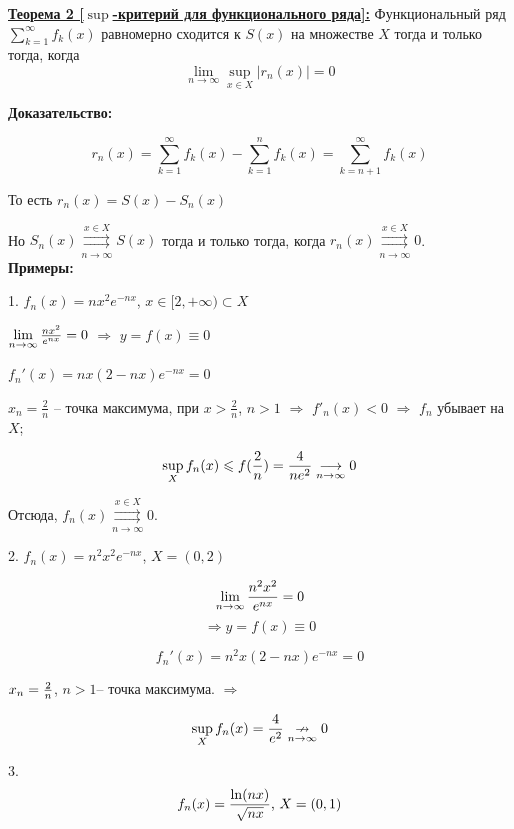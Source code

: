 \documentclass[a4paper,12pt]{article} %
\renewcommand {\leq}{\leqslant}
\begin{document}
\underline{\textbf{Теорема 2 [$\sup$-критерий для функционального ряда]:}}\newline 
Функциональный ряд $\sum\limits_{k = 1}^{\infty}  f_k(x)$ равномерно сходится к $S(x)$ на множестве $X$ тогда и только тогда, когда $$\lim\limits_{n \rightarrow \infty} \sup_{x \in X} |r_n(x)| = 0$$

\textbf{Доказательство:} 

$$r_n(x) = \sum\limits_{k = 1}^{\infty}  f_k(x) -  \sum\limits_{k = 1}^{n}  f_k(x)= \sum\limits_{k = n+1}^{\infty}  f_k(x)$$ \newline

То есть $r_n(x)=S(x)-S_n(x)$ \newline

Но $S_n(x) \overset{x \in X}{\underset{n \rightarrow \infty}{\rightrightarrows}} S(x)$ тогда и только тогда, когда $r_n(x) \overset{x \in X}{\underset{n \rightarrow \infty}{\rightrightarrows}} 0$.\\

\textbf{Примеры:}

1. $f_n(x) = nx^2e^{-nx}$, $x \in [2, +\infty) \subset X$

$\lim\limits_{n \rightarrow \infty}{nx^2 \over e^{nx}} = 0$ $\Rightarrow$ $y=f(x) \equiv 0$

$f_n'(x) = nx(2-nx)e^{-nx} = 0$

\hspace*{5mm}$x_n = {\frac{2}{n}}$ -- точка максимума, при $x > {\frac{2}{n}}$, $n>1$ $\Rightarrow$ $f'_n(x) < 0$ $\Rightarrow$ $f_n$ убывает на $X$;

$$\sup_{X}f_n(x) \leq f({2\over n}) = {4\over ne^2} \underset{n \rightarrow \infty}{\longrightarrow} 0 $$

Отсюда, $f_n(x) \overset{x \in X}{\underset{n \rightarrow \infty}{\rightrightarrows}} 0$.

2. $f_n(x) = n^2x^2e^{-nx}$, $X = (0,2)$

$$\lim\limits_{n \rightarrow \infty}{n^2x^2 \over e^{nx}} = 0$$ $$\Rightarrow y=f(x) \equiv 0$$

$$f_n'(x) = n^2x(2-nx)e^{-nx} = 0$$

\hspace*{5mm}$x_n = { 2 \over n}$,  $n>1$-- точка максимума. $\Rightarrow$

$$\sup_{X}f_n(x) = {4\over e^2} \underset{n \rightarrow \infty}{\nrightarrow} 0 $$

3. $$f_n(x) = {{\ln(nx)} \over {\sqrt{nx}}} \text{, } X = (0,1)$$
\end{document}
